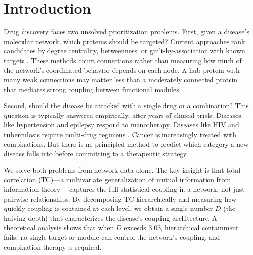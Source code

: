 \documentclass[11pt,a4paper]{article}
\begin{document}
\begin{abstract}
Alzheimer's disease ($D = 3.80$, global), the bill ranks APP \#1 (supporting anti-amyloid approaches) but $D$ predicts monotherapy will not be curative; BACE1 ranks \#26/41, explaining why every BACE inhibitor failed. In sepsis ($D = 4.01$, global), the framework explains 40 years of failed monotherapy trials: activated protein C (withdrawn 2011) targeted PROC, which ranks \#44/52---the coupling analysis would have predicted its failure. Finally, we show that $D$ predicts treatment durability: modular diseases maintain therapeutic response for a median of 10 years versus 1 year for global diseases ($p = 0.005$), suggesting that globally coupled networks route around single interventions. All results, code, and data are publicly available.
\end{abstract}

\section{Introduction}

Drug discovery faces two unsolved prioritization problems. First, given a disease's molecular network, which proteins should be targeted? Current approaches rank candidates by degree centrality, betweenness, or guilt-by-association with known targets \citep{barabasi2011,cheng2018,hopkins2008}. These methods count connections rather than measuring how much of the network's coordinated behavior depends on each node. A hub protein with many weak connections may matter less than a moderately connected protein that mediates strong coupling between functional modules.

Second, should the disease be attacked with a single drug or a combination? This question is typically answered empirically, after years of clinical trials. Diseases like hypertension and epilepsy respond to monotherapy. Diseases like HIV and tuberculosis require multi-drug regimens \citep{jia2009}. Cancer is increasingly treated with combinations. But there is no principled method to predict which category a new disease falls into before committing to a therapeutic strategy.

We solve both problems from network data alone. The key insight is that total correlation (TC)---a multivariate generalization of mutual information from information theory \citep{watanabe1960,studeny1998}---captures the full statistical coupling in a network, not just pairwise relationships. By decomposing TC hierarchically and measuring how quickly coupling is contained at each level, we obtain a single number $D$ (the halving depth) that characterizes the disease's coupling architecture. A theoretical analysis shows that when $D$ exceeds 3.03, hierarchical containment fails: no single target or module can control the network's coupling, and combination therapy is required.
\end{document}

